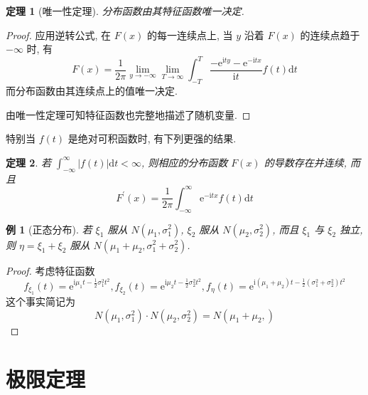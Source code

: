 \documentclass[12pt,a4paper]{article}
\newtheorem{thm}{定理}[subsection]  %
\newtheorem{example}{例}[subsection] %
\begin{document}
\begin{thm}[唯一性定理]
    分布函数由其特征函数唯一决定.
\end{thm}

\begin{proof}
    应用逆转公式, 在 $F(x)$ 的每一连续点上, 当 $y$ 沿着 $F(x)$ 的连续点趋于 $-\infty$ 时, 有 
    \[ F(x) = \frac{1}{2\pi} \lim_{y \to -\infty} \lim_{T \to \infty} \int_{-T}^{T} \frac{-\mathrm{e}^{\mathrm{i}ty} - \mathrm{e}^{-\mathrm{i}tx}}{\mathrm{i}t} f(t) \mathrm{d}t \]
    而分布函数由其连续点上的值唯一决定.

    由唯一性定理可知特征函数也完整地描述了随机变量.
\end{proof}

特别当 $f(t)$ 是绝对可积函数时, 有下列更强的结果.

\begin{thm}
    若 $\int_{-\infty}^{\infty} |f(t)| \mathrm{d}t < \infty$, 则相应的分布函数 $F(x)$ 的导数存在并连续, 而且 
    \[F^{\prime}(x) = \frac{1}{2\pi} \int_{-\infty}^{\infty} \mathrm{e}^{-\mathrm{i}tx} f(t) \mathrm{d}t\]
\end{thm}

\begin{example}[正态分布]
    若 $\xi_1$ 服从 $N(\mu_1, \sigma_1^2)$, $\xi_2$ 服从 $N(\mu_2, \sigma_2^2)$, 而且 $\xi_1$ 与 $\xi_2$ 独立, 则 $\eta = \xi_1 + \xi_2$ 服从 $N(\mu_1 + \mu_2, \sigma_1^2 + \sigma_2^2)$.
\end{example}

\begin{proof}
    考虑特征函数 
    \[
    f_{\xi_1}(t) = \mathrm{e}^{\mathrm{i} \mu_1 t - \frac{1}{2}\sigma_1^2 t^2 },
    f_{\xi_2}(t) = \mathrm{e}^{\mathrm{i} \mu_2 t - \frac{1}{2}\sigma_2^2 t^2 },
    f_{\eta}(t) = \mathrm{e}^{\mathrm{i} (\mu_1 + \mu_2) t - \frac{1}{2}(\sigma_1^2 + \sigma_2^2) t^2 }
    \]
    这个事实简记为 \[ N(\mu_1, \sigma_1^2) \cdot N(\mu_2, \sigma_2^2)  = N(\mu_1 + \mu_2,) \]
\end{proof}


\newpage

\section{极限定理}
\end{document}
